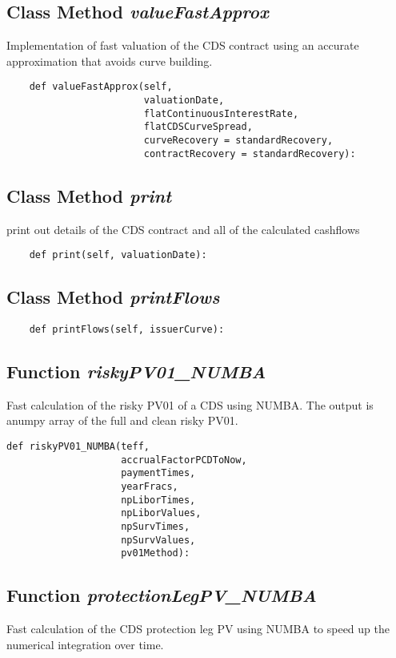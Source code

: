 \documentclass[twoside,11pt]{book}
\begin{document}
\subsection{Class Method {\it valueFastApprox}}
Implementation of fast valuation of the CDS contract using an accurate approximation that avoids curve building. 

\begin{lstlisting}
    def valueFastApprox(self,
                        valuationDate,
                        flatContinuousInterestRate,
                        flatCDSCurveSpread,
                        curveRecovery = standardRecovery,
                        contractRecovery = standardRecovery):
\end{lstlisting}

\subsection{Class Method {\it print}}
print out details of the CDS contract and all of the calculated cashflows 

\begin{lstlisting}
    def print(self, valuationDate):
\end{lstlisting}

\subsection{Class Method {\it printFlows}}


\begin{lstlisting}
    def printFlows(self, issuerCurve):
\end{lstlisting}

\subsection{Function {\it riskyPV01\_NUMBA}}
Fast calculation of the risky PV01 of a CDS using NUMBA. The output is anumpy array of the full and clean risky PV01.

\begin{lstlisting}
def riskyPV01_NUMBA(teff, 
                    accrualFactorPCDToNow,
                    paymentTimes,
                    yearFracs,
                    npLiborTimes,
                    npLiborValues,
                    npSurvTimes,
                    npSurvValues,
                    pv01Method):
\end{lstlisting}

\subsection{Function {\it protectionLegPV\_NUMBA}}
Fast calculation of the CDS protection leg PV using NUMBA to speed up the numerical integration over time. 
\end{document}
